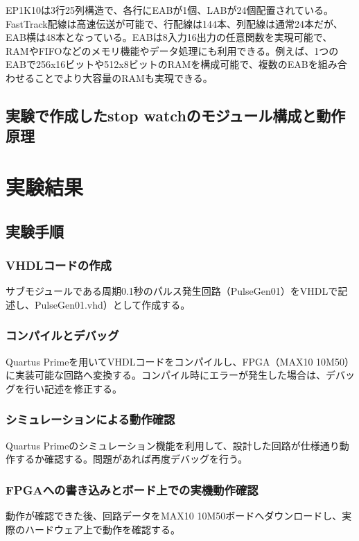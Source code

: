 \documentclass{jlreq}
\numberwithin{equation}{section}
\begin{document}
EP1K10は3行25列構造で、各行にEABが1個、LABが24個配置されている。FastTrack配線は高速伝送が可能で、行配線は144本、列配線は通常24本だが、EAB横は48本となっている。EABは8入力16出力の任意関数を実現可能で、RAMやFIFOなどのメモリ機能やデータ処理にも利用できる。例えば、1つのEABで256x16ビットや512x8ビットのRAMを構成可能で、複数のEABを組み合わせることでより大容量のRAMも実現できる。

\subsection{実験で作成したstop watchのモジュール構成と動作原理}

\section{実験結果}

\subsection{実験手順}

\subsubsection{VHDLコードの作成}
サブモジュールである周期0.1秒のパルス発生回路（PulseGen01）をVHDLで記述し、PulseGen01.vhd）として作成する。

\subsubsection{コンパイルとデバッグ}
Quartus Primeを用いてVHDLコードをコンパイルし、FPGA（MAX10 10M50）に実装可能な回路へ変換する。コンパイル時にエラーが発生した場合は、デバッグを行い記述を修正する。

\subsubsection{シミュレーションによる動作確認}
Quartus Primeのシミュレーション機能を利用して、設計した回路が仕様通り動作するか確認する。問題があれば再度デバッグを行う。

\subsubsection{FPGAへの書き込みとボード上での実機動作確認}
動作が確認できた後、回路データをMAX10 10M50ボードへダウンロードし、実際のハードウェア上で動作を確認する。
\end{document}
